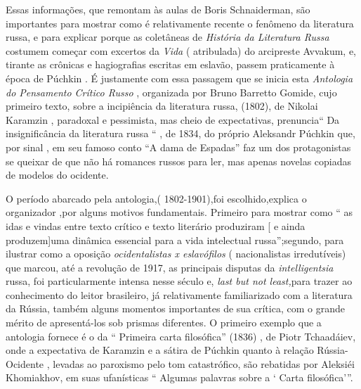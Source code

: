 Essas informações, que remontam às aulas de Boris Schnaiderman, são
importantes para mostrar como é relativamente recente o fenômeno da
literatura russa, e para explicar porque as coletâneas de \emph{História
da Literatura Russa} costumem começar com excertos da \emph{Vida} (
atribulada) do arcipreste Avvakum, e, tirante as crônicas e hagiografias
escritas em eslavão, passem praticamente à época de Púchkin . É
justamente com essa passagem que se inicia esta \emph{Antologia do
Pensamento Crítico Russo} , organizada por Bruno Barretto Gomide, cujo
primeiro texto, sobre a incipiência da literatura russa, (1802), de
Nikolai Karamzin , paradoxal e pessimista, mas cheio de expectativas,
prenuncia`` Da insignificância da literatura russa `` , de 1834, do
próprio Aleksandr Púchkin que, por sinal , em seu famoso conto ``A dama
de Espadas'' faz um dos protagonistas se queixar de que não há romances
russos para ler, mas apenas novelas copiadas de modelos do ocidente.

O período abarcado pela antologia,( 1802-1901),foi escolhido,explica o
organizador ,por alguns motivos fundamentais. Primeiro para mostrar como
`` as idas e vindas entre texto crítico e texto literário produziram {[}
e ainda produzem{]}uma dinâmica essencial para a vida intelectual
russa'';segundo, para ilustrar como a oposição \emph{ocidentalistas x
eslavófilos} ( nacionalistas irredutíveis) que marcou, até a revolução
de 1917, as principais disputas da \emph{intelligentsia} russa, foi
particularmente intensa nesse século e, \emph{last but not least,}para
trazer ao conhecimento do leitor brasileiro, já relativamente
familiarizado com a literatura da Rússia, também alguns momentos
importantes de sua crítica, com o grande mérito de apresentá-los sob
prismas diferentes. O primeiro exemplo que a antologia fornece é o da ``
Primeira carta filosófica'' (1836) , de Piotr Tchaadáiev, onde a
expectativa de Karamzin e a sátira de Púchkin quanto à relação
Rússia-Ocidente , levadas ao paroxismo pelo tom catastrófico, são
rebatidas por Aleksiéi Khomiakhov, em suas ufanísticas `` Algumas
palavras sobre a ` Carta filosófica'''.

